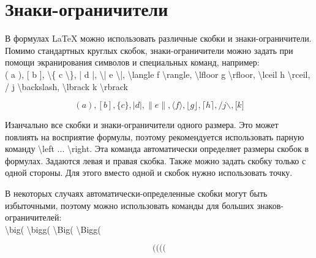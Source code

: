 \documentclass[a4paper,12pt]{article}
\begin{document}
{\section{Знаки-ограничители}
\hspace{1.25cm}В формулах LaTeX можно использовать различные скобки и знаки-ограничители.
Помимо стандартных круглых скобок, знаки-ограничители можно задать при помощи экранирования символов и специальных команд, например:\\
\textsf{( a ), [ b ], \textbackslash\{ c \textbackslash\}, | d |, \textbackslash| e \textbackslash|,
\textbackslash langle f \textbackslash rangle, \textbackslash lfloor g \textbackslash rfloor,
\textbackslash lceil h \textbackslash rceil,\\
/ j \textbackslash backslash, \textbackslash lbrack k \textbackslash rbrack}

\begin{equation*}
( a ), [ b ], \{ c \}, | d |, \| e \|,
\langle f \rangle, \lfloor g \rfloor,
\lceil h \rceil,
/ j \backslash, \lbrack k \rbrack
\end{equation*}

Изанчально все скобки и знаки-ограничители одного размера.
Это может пов\-ли\-ять на восприятие формулы, поэтому рекомендуется использовать парную команду \textsf{\textbackslash left ... \textbackslash right}.
Эта команда автоматически определяет размеры скобок в формулах. Задаются левая и правая скобка. Также можно задать скобку только с одной стороны.
Для этого вместо одной и скобок нужно использовать точку.

В некоторых случаях автоматически-определенные скобки могут быть избыточ\-ными, поэтому можно использовать команды для больших знаков-ограничителей:\\
\textsf{\textbackslash big( \textbackslash bigg( \textbackslash Big( \textbackslash Bigg(}

$$\big( \bigg( \Big( \Bigg($$

}
\end{document}
